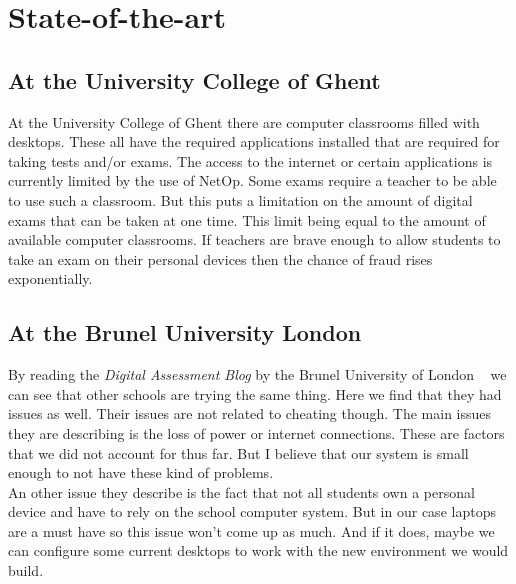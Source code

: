 \documentclass[fleqn,10pt]{voorstel}
\begin{document}

\section{State-of-the-art}
\label{sec:state-of-the-art}
\subsection{At the University College of Ghent}
At the University College of Ghent there are computer classrooms filled with desktops. These all have the required applications installed that are required for taking tests and/or exams. The access to the internet or certain applications is currently limited by the use of NetOp. Some exams require a teacher to be able to use such a classroom. But this puts a limitation on the amount of digital exams that can be taken at one time. This limit being equal to the amount of available computer classrooms. If teachers are brave enough to allow students to take an exam on their personal devices then the chance of fraud rises exponentially. 
\\
\subsection{At the Brunel University London}
By reading the\emph{ Digital Assessment Blog} by the Brunel University of London ~\autocite{Brunel2017} we can see that other schools are trying the same thing. Here we find that they had issues as well. Their issues are not related to cheating though. The main issues they are describing is the loss of power or internet connections. These are factors that we did not account for thus far. But I believe that our system is small enough to not have these kind of problems. \\
An other issue they describe is the fact that not all students own a personal device and have to rely on the school computer system. But in our case laptops are a must have so this issue won’t come up as much. And if it does, maybe we can configure some current desktops to work with the new environment we would build. \\
\end{document}
